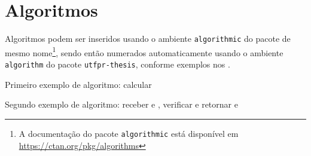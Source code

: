 \section{Algoritmos}%
\label{sect:alg}

Algoritmos podem ser inseridos usando o ambiente \texttt{algorithmic} do pacote de mesmo nome\footnote{A documentação do pacote \texttt{algorithmic} está disponível em \url{https://ctan.org/pkg/algorithms}}, sendo então numerados automaticamente usando o ambiente \texttt{algorithm} do pacote \texttt{utfpr-thesis}, conforme exemplos nos .

\begin{algorithm}[!htbp]
\caption{Primeiro exemplo de algoritmo: calcular }%
\label{alg:ex-1}
\begin{algorithmic}[1]
 
  \ELSE[$N$ é ímpar]
  \ENDIF{}
\ENDWHILE{}
\end{algorithmic}
\end{algorithm}

\begin{algorithm}[!htbp]
\caption{Segundo exemplo de algoritmo: receber  e , verificar  e retornar  e }%
\label{alg:ex-2}
\begin{algorithmic}[1]
 
\ENDIF{}
 
\end{algorithmic}
\end{algorithm}
